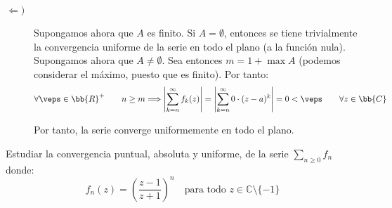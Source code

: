 \begin{ejercicio}
\begin{description}
        \item[$\Longleftarrow)$] Supongamos ahora que $A$ es finito. Si $A=\emptyset$, entonces se tiene trivialmente la convergencia uniforme de la serie en todo el plano (a la función nula). Supongamos ahora que $A\neq \emptyset$. Sea entonces $m=1+\max A$ (podemos considerar el máximo, puesto que es finito). Por tanto:
        \begin{equation*}
            \forall \veps\in \bb{R}^+\qquad n\geq m\Longrightarrow \left|\sum_{k=n}^\infty f_k(z)\right| = \left|\sum_{k=n}^\infty 0\cdot (z-a)^k\right| = 0 < \veps\qquad \forall z\in \bb{C}
        \end{equation*}

        Por tanto, la serie converge uniformemente en todo el plano.
    \end{description}
\end{ejercicio}

\begin{ejercicio}
    Estudiar la convergencia puntual, absoluta y uniforme, de la serie $\displaystyle \sum_{n \geq 0} f_n$ donde:
    \[
        f_n(z) = \left(\dfrac{z-1}{z+1}\right)^n \quad \text{para todo } z \in \mathbb{C}\setminus\{-1\}
    \]

\end{ejercicio}
